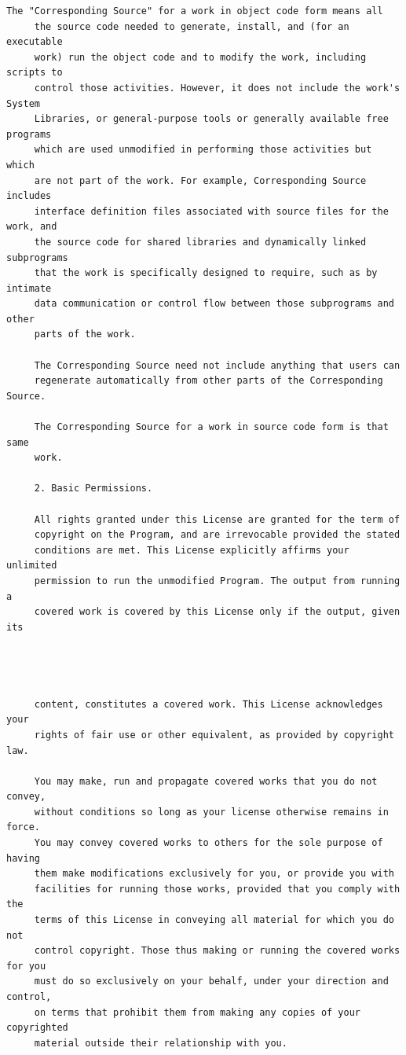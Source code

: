 \begin{lstlisting}[basicstyle=\ttfamily\footnotesize,breaklines=true]
     The "Corresponding Source" for a work in object code form means all
     the source code needed to generate, install, and (for an executable
     work) run the object code and to modify the work, including scripts to
     control those activities. However, it does not include the work's System
     Libraries, or general-purpose tools or generally available free programs
     which are used unmodified in performing those activities but which
     are not part of the work. For example, Corresponding Source includes
     interface definition files associated with source files for the work, and
     the source code for shared libraries and dynamically linked subprograms
     that the work is specifically designed to require, such as by intimate
     data communication or control flow between those subprograms and other
     parts of the work.

     The Corresponding Source need not include anything that users can
     regenerate automatically from other parts of the Corresponding Source.

     The Corresponding Source for a work in source code form is that same
     work.

     2. Basic Permissions.

     All rights granted under this License are granted for the term of
     copyright on the Program, and are irrevocable provided the stated
     conditions are met. This License explicitly affirms your unlimited
     permission to run the unmodified Program. The output from running a
     covered work is covered by this License only if the output, given its




     content, constitutes a covered work. This License acknowledges your
     rights of fair use or other equivalent, as provided by copyright law.

     You may make, run and propagate covered works that you do not convey,
     without conditions so long as your license otherwise remains in force.
     You may convey covered works to others for the sole purpose of having
     them make modifications exclusively for you, or provide you with
     facilities for running those works, provided that you comply with the
     terms of this License in conveying all material for which you do not
     control copyright. Those thus making or running the covered works for you
     must do so exclusively on your behalf, under your direction and control,
     on terms that prohibit them from making any copies of your copyrighted
     material outside their relationship with you.


\end{lstlisting}
